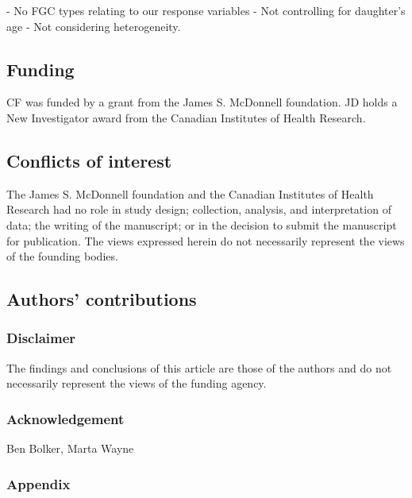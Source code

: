 \documentclass[12pt,]{article}
\begin{document}
- No FGC types relating to our response variables
- Not controlling for daughter’s age
- Not considering heterogeneity.


\subsection{Funding}\label{Funding}

CF was funded by a grant from the James S. McDonnell foundation. JD holds a New Investigator award from the Canadian Institutes of Health Research.

\subsection{Conflicts of interest}\label{Conflicts-of-Interest}

The James S. McDonnell foundation and the Canadian Institutes of Health Research had no role in study design; collection, analysis, and interpretation of data; the writing of the manuscript; or in the decision to submit the manuscript for publication.  The views expressed herein do not necessarily represent the views of the founding bodies.

\subsection{Authors' contributions}\label{Authors'-contributions}

\subsubsection{Disclaimer}\label{disclaimer}

The findings and conclusions of this article are those of the authors
and do not necessarily represent the views of the funding agency.

\subsubsection{Acknowledgement}\label{Acknowledgement}
Ben Bolker,  Marta Wayne

\subsubsection{Appendix}\label{appendix-1}


\end{document}

